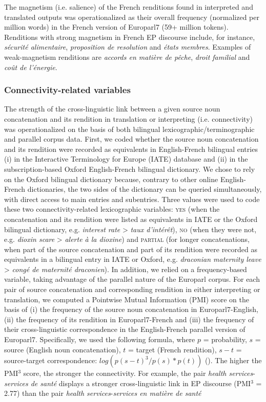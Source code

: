 \documentclass[output=paper]{langscibook}
\begin{document}
The magnetism (i.e. salience) of the French renditions found in interpreted and translated outputs was operationalized as their overall frequency (normalized per million words) in the French version of Europarl7 (59+ million tokens). Renditions with strong magnetism in French EP discourse include, for instance, \textit{sécurité alimentaire}, \textit{proposition de resolution} and \textit{états membres}. Examples of weak-magnetism renditions are \textit{accords en matière de pêche}, \textit{droit familial} and \textit{coût de l’énergie}. 

\subsubsection{Connectivity-related variables}\label{sec:lefer:3.2.3}

The strength of the cross-linguistic link between a given source noun concatenation and its rendition in translation or interpreting (i.e. connectivity) was operationalized on the basis of both bilingual lexicographic/terminographic and parallel corpus data. First, we coded whether the source noun concatenation and its rendition were recorded as equivalents in English-French bilingual entries (i) in the Interactive Terminology for Europe (IATE) database and (ii) in the subscription-based Oxford English-French bilingual dictionary. We chose to rely on the Oxford bilingual dictionary because, contrary to other online English-French dictionaries, the two sides of the dictionary can be queried simultaneously, with direct access to main entries and subentries. Three values were used to code these two connectivity-related lexicographic variables: \textsc{yes} (when the concatenation and its rendition were listed as equivalents in IATE or the Oxford bilingual dictionary, e.g. \textit{interest rate} > \textit{taux d’intérêt}), \textsc{no} (when they were not, e.g. \textit{dioxin scare} > \textit{alerte à la dioxine}) and \textsc{partial} (for longer concatenations, when part of the source concatenation and part of its rendition were recorded as equivalents in a bilingual entry in IATE or Oxford, e.g. \textit{draconian maternity leave} > \textit{congé de maternité draconien}). In addition, we relied on a frequency-based variable, taking advantage of the parallel nature of the Europarl corpus. For each pair of source concatenation and corresponding rendition in either interpreting or translation, we computed a Pointwise Mutual Information (PMI) score on the basis of (i) the frequency of the source noun concatenation in Europarl7-English, (ii) the frequency of its rendition in Europarl7-French and (iii) the frequency of their cross-linguistic correspondence in the English-French parallel version of Europarl7. Specifically, we used the following formula, where $p$ = probability, $s$ = source (English noun concatenation), $t$ = target (French rendition), $s-t$ = source-target correspondence: $log(p(s-t)^3/p(s)*p(t))$ (\citealt[cf.][]{RoleNadif2011}). The higher the PMI$^3$ score, the stronger the connectivity. For example, the pair \textit{health services}-\textit{services de santé} displays a stronger cross-linguistic link in EP discourse (PMI$^3$ = 2.77) than the pair \textit{health services}{}-\textit{services en matière de santé} 
\end{document}
